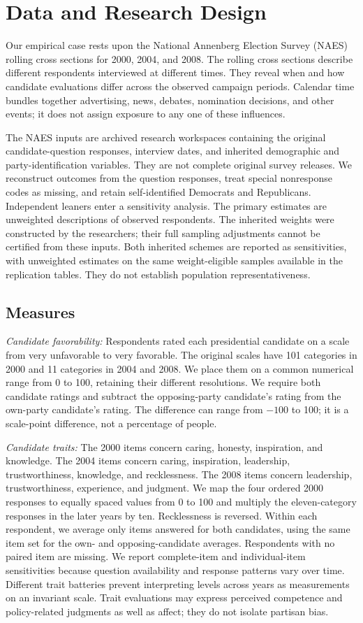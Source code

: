 \documentclass[11pt,letterpaper]{article}
\begin{document}
\section*{Data and Research Design}
Our empirical case rests upon the National Annenberg Election Survey (NAES) rolling cross sections for 2000, 2004, and 2008. The rolling cross sections describe different respondents interviewed at different times. They reveal when and how candidate evaluations differ across the observed campaign periods. Calendar time bundles together advertising, news, debates, nomination decisions, and other events; it does not assign exposure to any one of these influences.

The NAES inputs are archived research workspaces containing the original candidate-question responses, interview dates, and inherited demographic and party-identification variables. They are not complete original survey releases. We reconstruct outcomes from the question responses, treat special nonresponse codes as missing, and retain self-identified Democrats and Republicans. Independent leaners enter a sensitivity analysis. The primary estimates are unweighted descriptions of observed respondents. The inherited weights were constructed by the researchers; their full sampling adjustments cannot be certified from these inputs. Both inherited schemes are reported as sensitivities, with unweighted estimates on the same weight-eligible samples available in the replication tables. They do not establish population representativeness.

\subsection*{Measures}
\textit{Candidate favorability:} Respondents rated each presidential candidate on a scale from very unfavorable to very favorable. The original scales have 101 categories in 2000 and 11 categories in 2004 and 2008. We place them on a common numerical range from 0 to 100, retaining their different resolutions. We require both candidate ratings and subtract the opposing-party candidate's rating from the own-party candidate's rating. The difference can range from $-100$ to 100; it is a scale-point difference, not a percentage of people.

\textit{Candidate traits:} The 2000 items concern caring, honesty, inspiration, and knowledge. The 2004 items concern caring, inspiration, leadership, trustworthiness, knowledge, and recklessness. The 2008 items concern leadership, trustworthiness, experience, and judgment. We map the four ordered 2000 responses to equally spaced values from 0 to 100 and multiply the eleven-category responses in the later years by ten. Recklessness is reversed. Within each respondent, we average only items answered for both candidates, using the same item set for the own- and opposing-candidate averages. Respondents with no paired item are missing. We report complete-item and individual-item sensitivities because question availability and response patterns vary over time. Different trait batteries prevent interpreting levels across years as measurements on an invariant scale. Trait evaluations may express perceived competence and policy-related judgments as well as affect; they do not isolate partisan bias.
\end{document}
